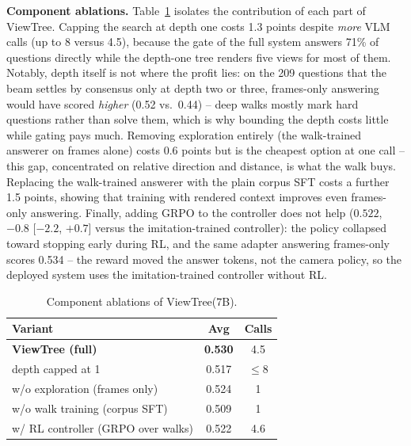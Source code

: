 \documentclass[sigconf,10pt]{acmart}
\newcommand{\system}{ViewTree\xspace}
\begin{document}
\noindent\textbf{Component ablations.} Table~\ref{tab:vt_component_ablation} isolates the contribution of each part of \system. Capping the search at depth one costs 1.3 points despite \emph{more} VLM calls (up to 8 versus 4.5), because the gate of the full system answers 71\% of questions directly while the depth-one tree renders five views for most of them. Notably, depth itself is not where the profit lies: on the 209 questions that the beam settles by consensus only at depth two or three, frames-only answering would have scored \emph{higher} (0.52 vs.\ 0.44) -- deep walks mostly mark hard questions rather than solve them, which is why bounding the depth costs little while gating pays much. Removing exploration entirely (the walk-trained answerer on frames alone) costs 0.6 points but is the cheapest option at one call -- this gap, concentrated on relative direction and distance, is what the walk buys. Replacing the walk-trained answerer with the plain corpus SFT costs a further 1.5 points, showing that training with rendered context improves even frames-only answering. Finally, adding GRPO to the controller does not help ($0.522$, $-0.8$ [$-2.2$, $+0.7$] versus the imitation-trained controller): the policy collapsed toward stopping early during RL, and the same adapter answering frames-only scores 0.534 -- the reward moved the answer tokens, not the camera policy, so the deployed system uses the imitation-trained controller without RL.

\begin{table}[t]
	\centering
	\small
	\begin{tabular}{lcc}
		\toprule
		\textbf{Variant} & \textbf{Avg} & \textbf{Calls} \\ \midrule
		\textbf{ViewTree (full)}                & \textbf{0.530} & 4.5 \\
		\;\;depth capped at 1                   & 0.517          & $\le$8 \\
		\;\;w/o exploration (frames only)       & 0.524          & 1 \\
		\;\;w/o walk training (corpus SFT)      & 0.509          & 1 \\
		\;\;w/ RL controller (GRPO over walks)  & 0.522          & 4.6 \\ \bottomrule
	\end{tabular}
	\caption{Component ablations of \system (7B).}
	\label{tab:vt_component_ablation}
	\vspace{-0.2in}
\end{table}


	
	
\end{document}
